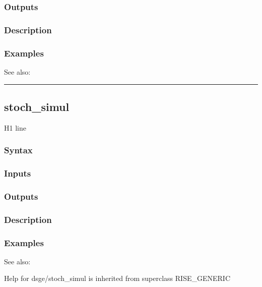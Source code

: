 \documentclass[letterpaper,10pt,english]{sphinxmanual}
\begin{document}
\subsubsection{Outputs}
\label{classes/models/@dsge/dsge:id188}

\subsubsection{Description}
\label{classes/models/@dsge/dsge:id189}

\subsubsection{Examples}
\label{classes/models/@dsge/dsge:id190}
See also:


\bigskip\hrule{}\bigskip



\subsection{stoch\_simul}
\label{classes/models/@dsge/dsge:stoch-simul}\label{classes/models/@dsge/dsge:id191}
H1 line


\subsubsection{Syntax}
\label{classes/models/@dsge/dsge:id192}

\subsubsection{Inputs}
\label{classes/models/@dsge/dsge:id193}

\subsubsection{Outputs}
\label{classes/models/@dsge/dsge:id194}

\subsubsection{Description}
\label{classes/models/@dsge/dsge:id195}

\subsubsection{Examples}
\label{classes/models/@dsge/dsge:id196}
See also:

Help for dsge/stoch\_simul is inherited from superclass RISE\_GENERIC
\end{document}
